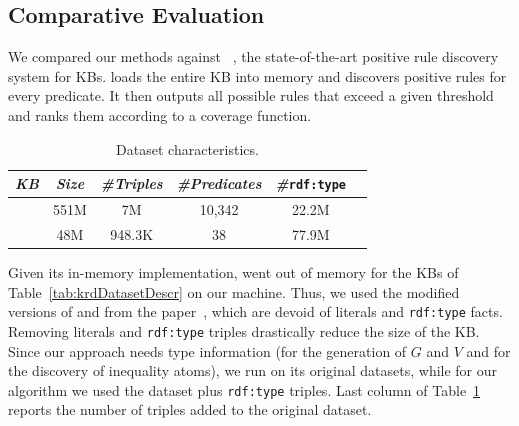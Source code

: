 \vspace{-1ex}
\subsection{Comparative Evaluation} \label{sec:krd_comparative}
\vspace{-1ex}
We compared our methods against \amie~\cite{galarraga2015fast}, the state-of-the-art positive rule discovery system for KBs.
%
\amie loads the entire KB into memory and discovers positive rules for every predicate. %
It then outputs all possible rules that exceed a given threshold and ranks them according to a coverage function.

\begin{table}[htb]
	\centering
	\caption{\amie Dataset characteristics.}
	\label{tab:AmieDatasetDescr}
	\begin{small}
		\begin{tabular}{|c|c|c|c|c|c|}
			\hline
			\hline
			{\it KB}&{\it Size}&{\it  \#Triples}&{\it \#Predicates}&{\it \#}\texttt{rdf:type}\tabularnewline
			\hline
			\dbpedia & 551M & 7M & 10,342 & 22.2M \tabularnewline
			\yago 2 & 48M & 948.3K & 38 & 77.9M  \tabularnewline
			\hline
		\end{tabular}
	\end{small}
\end{table}

Given its in-memory implementation, \amie went out of memory for the KBs of Table~\ref{tab:krdDatasetDescr} on our machine. Thus, we used the modified versions of \yago and \dbpedia from the \amie paper~\cite{galarraga2015fast}, which are devoid of literals and \texttt{rdf:type} facts.
%
Removing literals and \texttt{rdf:type} triples drastically reduce the size of the KB. Since our approach needs type information (for the generation of $G$ and $V$ and for the discovery of inequality atoms), we run \amie on its original datasets, while for our algorithm we used the \amie dataset plus \texttt{rdf:type} triples. Last column of Table~\ref{tab:AmieDatasetDescr} reports the number of triples added to the original \amie dataset.

